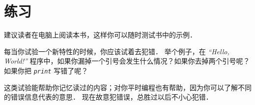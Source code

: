 \section{练习}

\begin{exercise}


建议读者在电脑上阅读本书，这样你可以随时测试书中的示例．


每当你试验一个新特性的时候，你应该试着去犯错． 举个例子，在 {\em “Hello, World!”} 程序中，如果你漏掉一个引号会发生什么情况？如果你去掉两个引号呢？如果你把 {\em \lstinline{print}} 写错了呢？
  


这类试验能帮助你记忆读过的内容；对你平时编程也有帮助，因为你可以了解不同的错误信息代表的意思． 现在故意犯错误，总胜过以后不小心犯错．



\end{exercise}
